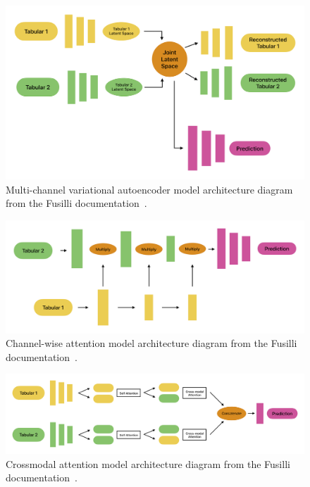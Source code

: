 \begin{figure}[h]
    \centering
    \includegraphics[width=1\linewidth]{figures//diagrams/MCVAE}
    \caption[Multi-channel variational autoencoder model architecture diagram.]{Multi-channel variational autoencoder model architecture diagram from the Fusilli documentation~\cite{townendFlorencejtFusilliFusilli2024}.}
    \label{fig:MCVAE}
\end{figure}

\begin{figure}[h]
    \centering
    \includegraphics[width=1\linewidth]{figures//diagrams/TabularChannelwiseAttention}
    \caption[Channel-wise attention model architecture diagram.]{Channel-wise attention model architecture diagram from the Fusilli documentation~\cite{townendFlorencejtFusilliFusilli2024}.}
    \label{fig:TabularChannelwiseAttention}
\end{figure}

\begin{figure}[h]
    \centering
    \includegraphics[width=0.8\linewidth]{figures//diagrams/TabularCrossmodalAttention}
    \caption[Crossmodal attention model architecture diagram.]{Crossmodal attention model architecture diagram from the Fusilli documentation~\cite{townendFlorencejtFusilliFusilli2024}.}
    \label{fig:TabularCrossmodalAttention}
\end{figure}

